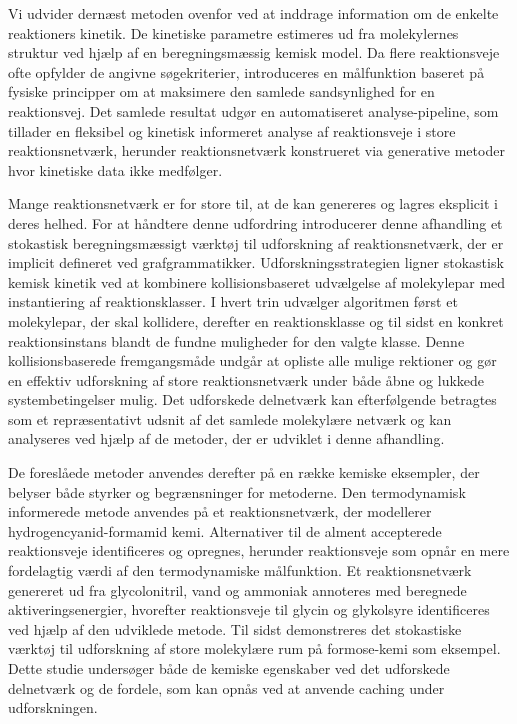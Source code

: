 Vi udvider dernæst metoden ovenfor ved at inddrage information om de enkelte reaktioners kinetik. De kinetiske parametre estimeres ud fra molekylernes struktur ved hjælp af en beregningsmæssig kemisk model. Da flere reaktionsveje ofte opfylder de angivne søgekriterier, introduceres en målfunktion baseret på fysiske principper om at maksimere den samlede sandsynlighed for en reaktionsvej. Det samlede resultat udgør en automatiseret analyse-pipeline, som tillader en fleksibel og kinetisk informeret analyse af reaktionsveje i store reaktionsnetværk, herunder reaktionsnetværk konstrueret via generative metoder hvor kinetiske data ikke medfølger.

Mange reaktionsnetværk er for store til, at de kan genereres og lagres eksplicit i deres helhed. For at håndtere denne udfordring introducerer denne afhandling et stokastisk beregningsmæssigt værktøj til udforskning af reaktionsnetværk, der er implicit defineret ved grafgrammatikker. Udforskningsstrategien ligner stokastisk kemisk kinetik ved at kombinere kollisionsbaseret udvælgelse af molekylepar med instantiering af reaktionsklasser. I hvert trin udvælger algoritmen først et molekylepar, der skal kollidere, derefter en reaktionsklasse og til sidst en konkret reaktionsinstans blandt de fundne muligheder for den valgte klasse. Denne kollisionsbaserede fremgangsmåde undgår at opliste alle mulige rektioner og gør en effektiv udforskning af store reaktionsnetværk under både åbne og lukkede systembetingelser mulig. Det udforskede delnetværk kan efterfølgende betragtes som et repræsentativt udsnit af det samlede molekylære netværk og kan analyseres ved hjælp af de metoder, der er udviklet i denne afhandling.

De foreslåede metoder anvendes derefter på en række kemiske eksempler, der belyser både styrker og begrænsninger for metoderne. Den termodynamisk informerede metode anvendes på et reaktionsnetværk, der modellerer hydrogencyanid-formamid kemi. Alternativer til de alment accepterede reaktionsveje identificeres og opregnes, herunder reaktionsveje som opnår en mere fordelagtig værdi af den termodynamiske målfunktion. Et reaktionsnetværk genereret ud fra glycolonitril, vand og ammoniak annoteres med beregnede aktiveringsenergier, hvorefter reaktionsveje til glycin og glykolsyre identificeres ved hjælp af den udviklede metode. Til sidst demonstreres det stokastiske værktøj til udforskning af store molekylære rum på  formose-kemi som eksempel. Dette studie undersøger både de kemiske egenskaber ved det udforskede delnetværk og de fordele, som kan opnås ved at anvende caching under udforskningen.

